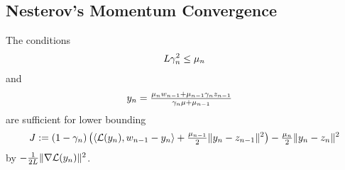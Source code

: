 \subsection{Nesterov's Momentum Convergence}

\begin{lemma}
	\label{lem-appendix: dumpster dive}
	The conditions
	\begin{align*}
		L\gamma_n^2 \le \mu_n
	\end{align*}
	and
	\begin{align*}
		y_n
		&= \tfrac{\mu_nw_{n-1} + \mu_{n-1}\gamma_n z_{n-1}}{\gamma_n\mu + \mu_{n-1}}
	\end{align*}
	are sufficient for lower bounding
	\begin{align*}
		J := (1-\gamma_n)\left(
			\langle \mathcal{L}(y_n), w_{n-1} - y_n\rangle
			+ \tfrac{\mu_{n-1}}{2}\|y_n - z_{n-1}\|^2
		\right)
		- \tfrac{\mu_n}{2}\|y_n - z_n\|^2
	\end{align*}
	by \(- \tfrac{1}{2L}\|\nabla\mathcal{L}(y_n)\|^2\).
\end{lemma}
